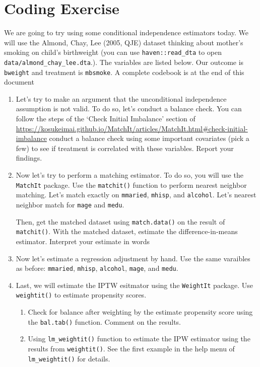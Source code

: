 \documentclass[12pt]{article}
\begin{document}
\section*{Coding Exercise}

We are going to try using some conditional independence estimators today. We will use the Almond, Chay, Lee (2005, QJE) dataset thinking about mother's smoking on child's birthweight (you can use \texttt{haven::read\_dta} to open \texttt{data/almond\_chay\_lee.dta}.). The variables are listed below. Our outcome is \texttt{bweight} and treatment is \texttt{mbsmoke}. A complete codebook is at the end of this document


\begin{enumerate}
  \item Let's try to make an argument that the unconditional independence assumption is not valid. To do so, let's conduct a balance check. You can follow the steps of the `Check Initial Imbalance' section of \url{https://kosukeimai.github.io/MatchIt/articles/MatchIt.html#check-initial-imbalance} conduct a balance check using some important covariates (pick a few) to see if treatment is correlated with these variables. Report your findings.
  
  \item Now let's try to perform a matching estimator. To do so, you will use the \texttt{MatchIt} package. Use the \texttt{matchit()} function to perform nearest neighbor matching. Let's match exactly on \texttt{mmaried}, \texttt{mhisp}, and \texttt{alcohol}. Let's nearest neighbor match for \texttt{mage} and \texttt{medu}. 
  
  Then, get the matched dataset using \texttt{match.data()} on the result of \texttt{matchit()}. With the matched dataset, estimate the difference-in-means estimator. Interpret your estimate in words


  \item Now let's estimate a regression adjustment by hand. Use the same varaibles as before: \texttt{mmaried}, \texttt{mhisp}, \texttt{alcohol}, \texttt{mage}, and \texttt{medu}.
  
  
  \item Last, we will estimate the IPTW esitmator using the \texttt{WeightIt} package. Use \texttt{weightit()} to estimate propensity scores.
  
  \begin{enumerate}
    \item Check for balance after weighting by the estimate propensity score using the \texttt{bal.tab()} function. Comment on the results.
    
    \item Using \texttt{lm\_weightit()} function to estimate the IPW estimator using the results from \texttt{weightit()}. See the first example in the help menu of \texttt{lm\_weightit()} for details.
  \end{enumerate}
\end{enumerate}
\end{document}
